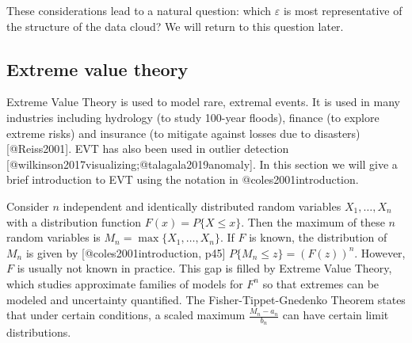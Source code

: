 \documentclass[
]{article}
\begin{document}
These considerations lead to a natural question: which \(\varepsilon\)
is most representative of the structure of the data cloud? We will
return to this question later.

\hypertarget{subsec:evt}{%
\subsection{Extreme value theory}\label{subsec:evt}}

Extreme Value Theory is used to model rare, extremal events. It is used
in many industries including hydrology (to study 100-year floods),
finance (to explore extreme risks) and insurance (to mitigate against
losses due to disasters) {[}@Reiss2001{]}. EVT has also been used in
outlier detection {[}@wilkinson2017visualizing;@talagala2019anomaly{]}.
In this section we will give a brief introduction to EVT using the
notation in @coles2001introduction.

Consider \(n\) independent and identically distributed random variables
\(X_1, \dots, X_n\) with a distribution function
\(F(x) = P\{X \leq x\}\). Then the maximum of these \(n\) random
variables is \(M_n = \max \{X_1, \dots, X_n\}\). If \(F\) is known, the
distribution of \(M_n\) is given by {[}@coles2001introduction, p45{]}
\(P\{M_n \leq z \} = \left(F(z)\right)^n\). However, \(F\) is usually
not known in practice. This gap is filled by Extreme Value Theory, which
studies approximate families of models for \(F^n\) so that extremes can
be modeled and uncertainty quantified. The Fisher-Tippet-Gnedenko
Theorem states that under certain conditions, a scaled maximum
\(\frac{M_n - a_n}{b_n}\) can have certain limit distributions.
\end{document}
